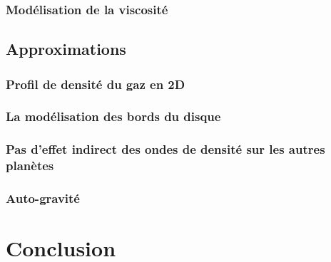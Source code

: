 \documentclass[logos,parttoc]{bordeaux-thesis}
\begin{document}
\subsection{Modélisation de la viscosité}



\section{Approximations}
\subsection{Profil de densité du gaz en 2D}
\subsection{La modélisation des bords du disque}
\subsection{Pas d'effet indirect des ondes de densité sur les autres planètes}
\subsection{Auto-gravité}

\chapter*{Conclusion}




\end{document}
